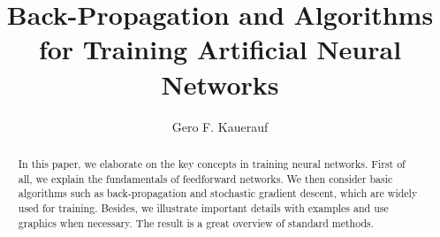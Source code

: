\documentclass[runningheads]{llncs}
\numberwithin{equation}{subsection} %
\begin{document}
%
\title{Back-Propagation and Algorithms for Training Artificial Neural Networks}
%
%
\author{Gero F. Kauerauf}
%
%
%
\maketitle              %
%
\begin{abstract}
    In this paper, we elaborate on the key concepts in training neural networks.
    First of all, we explain the fundamentals of feedforward networks.
    We then consider basic algorithms such as back-propagation and stochastic gradient descent, which are widely used for training.
    Besides, we illustrate important details with examples and use graphics when necessary.
    The result is a great overview of standard methods.
\end{abstract}
%
%
%















\end{document}
